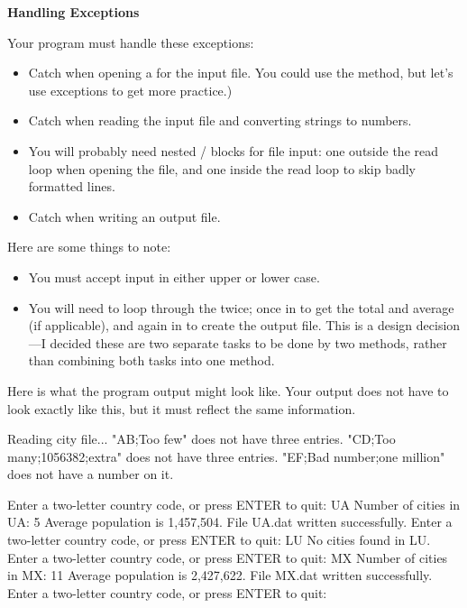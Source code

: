 \begin{exercise}
{\large\bf{Handling Exceptions}}

Your program must handle these exceptions:

\begin{itemize}
    \item Catch when opening a  for the input file. You could use the  method, but let's use exceptions to get more practice.)
    \item Catch  when reading the input file and converting strings to numbers.
    \item You will probably need nested / blocks for file input: one outside the read loop when opening the file, and one inside the read loop to skip badly formatted lines.
    \item Catch  when writing an output file.
\end{itemize}

Here are some things to note:

\begin{itemize}
    \item You must accept input in either upper or lower case.
    \item You will need to loop through the  twice; once in  to get the total and average (if applicable), and again in  to create the output file. This is a design decision---I decided these are two separate tasks to be done by two methods, rather than combining both tasks into one method.
\end{itemize}

Here is what the program output might look like. Your output does not have to look exactly like this, but it must reflect the same information.

\begin{stdout}
Reading city file...
"AB;Too few" does not have three entries.
"CD;Too many;1056382;extra" does not have three entries.
"EF;Bad number;one million" does not have a number on it.

Enter a two-letter country code, or press ENTER to quit: UA
Number of cities in UA: 5
Average population is 1,457,504.
File UA.dat written successfully.
Enter a two-letter country code, or press ENTER to quit: LU
No cities found in LU.
Enter a two-letter country code, or press ENTER to quit: MX
Number of cities in MX: 11
Average population is 2,427,622.
File MX.dat written successfully.
Enter a two-letter country code, or press ENTER to quit: 
\end{stdout}


\end{exercise}
